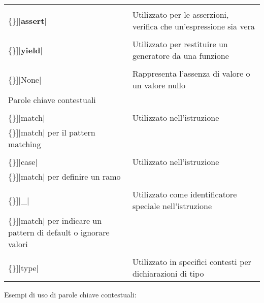 \documentclass[
  letterpaper,
  DIV=11,
  numbers=noendperiod]{scrreprt}
\newcommand{\VERB}{\Verb[commandchars=\\\{\}]}
\newcommand{\BuiltInTok}[1]{\textcolor[rgb]{0.00,0.23,0.31}{#1}}
\newcommand{\ControlFlowTok}[1]{\textcolor[rgb]{0.00,0.23,0.31}{\textbf{#1}}}
\newcommand{\NormalTok}[1]{\textcolor[rgb]{0.00,0.23,0.31}{#1}}
\newcommand{\VariableTok}[1]{\textcolor[rgb]{0.07,0.07,0.07}{#1}}
\begin{document}
\begin{longtable}[]{@{}
  >{\raggedright\arraybackslash}p{}
  >{\raggedright\arraybackslash}p{}@{}}
\VERB|\ControlFlowTok{assert}| & Utilizzato per le asserzioni, verifica
che un'espressione sia vera \\
\VERB|\ControlFlowTok{yield}| & Utilizzato per restituire un generatore
da una funzione \\
\VERB|\VariableTok{None}| & Rappresenta l'assenza di valore o un valore
nullo \\
Parole chiave contestuali & \\
\VERB|\NormalTok{match}| & Utilizzato nell'istruzione
\VERB|\NormalTok{match}| per il pattern matching \\
\VERB|\NormalTok{case}| & Utilizzato nell'istruzione
\VERB|\NormalTok{match}| per definire un ramo \\
\VERB|\NormalTok{\_}| & Utilizzato come identificatore speciale
nell'istruzione \VERB|\NormalTok{match}| per indicare un pattern di
default o ignorare valori \\
\VERB|\BuiltInTok{type}| & Utilizzato in specifici contesti per
dichiarazioni di tipo \\
\end{longtable}

Esempi di uso di parole chiave contestuali:
\end{document}

